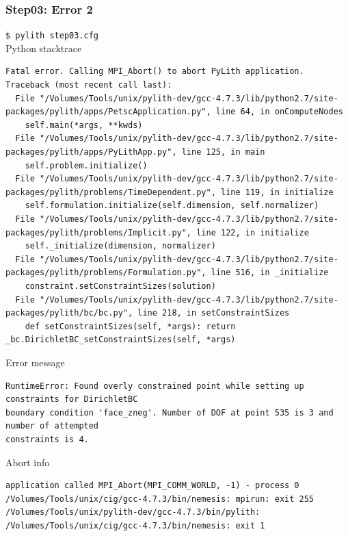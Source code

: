 \documentclass[aspectration=169]{beamer}
\newcommand{\cmd}[1]{{\footnotesize\tt \color{ltred}#1}}
\newcommand{\errlabel}[1]{{\small \color{blue}#1}}
\begin{document}
\begin{frame}[fragile]
  \frametitle{Step03: Error 2}

\cmd{\$ pylith step03.cfg}\\
\errlabel{Python stacktrace}
\begin{lstlisting}
Fatal error. Calling MPI_Abort() to abort PyLith application.
Traceback (most recent call last):
  File "/Volumes/Tools/unix/pylith-dev/gcc-4.7.3/lib/python2.7/site-packages/pylith/apps/PetscApplication.py", line 64, in onComputeNodes
    self.main(*args, **kwds)
  File "/Volumes/Tools/unix/pylith-dev/gcc-4.7.3/lib/python2.7/site-packages/pylith/apps/PyLithApp.py", line 125, in main
    self.problem.initialize()
  File "/Volumes/Tools/unix/pylith-dev/gcc-4.7.3/lib/python2.7/site-packages/pylith/problems/TimeDependent.py", line 119, in initialize
    self.formulation.initialize(self.dimension, self.normalizer)
  File "/Volumes/Tools/unix/pylith-dev/gcc-4.7.3/lib/python2.7/site-packages/pylith/problems/Implicit.py", line 122, in initialize
    self._initialize(dimension, normalizer)
  File "/Volumes/Tools/unix/pylith-dev/gcc-4.7.3/lib/python2.7/site-packages/pylith/problems/Formulation.py", line 516, in _initialize
    constraint.setConstraintSizes(solution)
  File "/Volumes/Tools/unix/pylith-dev/gcc-4.7.3/lib/python2.7/site-packages/pylith/bc/bc.py", line 218, in setConstraintSizes
    def setConstraintSizes(self, *args): return _bc.DirichletBC_setConstraintSizes(self, *args)
\end{lstlisting}
\errlabel{Error message}
\begin{lstlisting}
RuntimeError: Found overly constrained point while setting up constraints for DirichletBC
boundary condition 'face_zneg'. Number of DOF at point 535 is 3 and number of attempted
constraints is 4.
\end{lstlisting}
\errlabel{Abort info}
\begin{lstlisting}
application called MPI_Abort(MPI_COMM_WORLD, -1) - process 0
/Volumes/Tools/unix/cig/gcc-4.7.3/bin/nemesis: mpirun: exit 255
/Volumes/Tools/unix/pylith-dev/gcc-4.7.3/bin/pylith:
/Volumes/Tools/unix/cig/gcc-4.7.3/bin/nemesis: exit 1
\end{lstlisting}

\end{frame}
\end{document}
